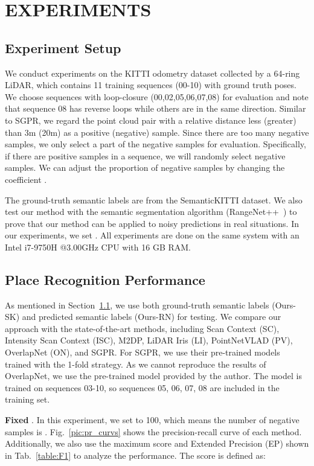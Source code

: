 \documentclass[letterpaper, 10 pt, conference]{ieeeconf}
\begin{document}
\section{EXPERIMENTS}


\subsection{Experiment Setup}\label{exp:setup}
We conduct experiments on the KITTI odometry dataset\cite{kitti} collected by a 64-ring LiDAR, which contains 11 training sequences (00-10) with ground truth poses. We choose sequences with loop-closure (00,02,05,06,07,08) for evaluation and note that sequence 08 has reverse loops while others are in the same direction. Similar to SGPR\cite{SGPR}, we regard the point cloud pair with a relative distance less (greater) than 3m (20m) as a positive (negative) sample. Since there are too many negative samples, we only select a part of the negative samples for evaluation. Specifically, if there are  positive samples in a sequence, we will randomly select  negative samples. We can adjust the proportion of negative samples by changing the coefficient .

The ground-truth semantic labels are from the SemanticKITTI dataset\cite{semkitti}. We also test our method with the semantic segmentation algorithm (RangeNet++~\cite{rangenet++})  to prove that our method can be applied to noisy predictions in real situations. In our experiments, we set . All experiments are done on the same system with an Intel i7-9750H @3.00GHz CPU with 16 GB RAM.

\subsection{Place Recognition Performance}\label{seu:pr}
As mentioned in Section~\ref{exp:setup}, we use both ground-truth semantic labels (Ours-SK) and predicted semantic labels (Ours-RN) for testing. We compare our approach with the state-of-the-art methods, including Scan Context\cite{SC} (SC), Intensity Scan Context\cite{ISC} (ISC), M2DP\cite{M2DP}, LiDAR Iris\cite{LI} (LI), PointNetVLAD\cite{PV} (PV), OverlapNet\cite{ON} (ON), and SGPR\cite{SGPR}. For SGPR, we use their pre-trained models trained with the 1-fold strategy. As we cannot reproduce the results of OverlapNet, we use the pre-trained model provided by the author. The model is trained on sequences 03-10, so sequences 05, 06, 07, 08 are included in the training set.

\textbf{Fixed }. In this experiment, we set  to 100, which means the number of negative samples is . Fig.~\ref{pic:pr_curvs} shows the precision-recall curve of each method. Additionally, we also use the maximum  score and Extended Precision\cite{EP} (EP) shown in Tab.~\ref{table:F1} to analyze the performance. The  score is defined as:
\end{document}
